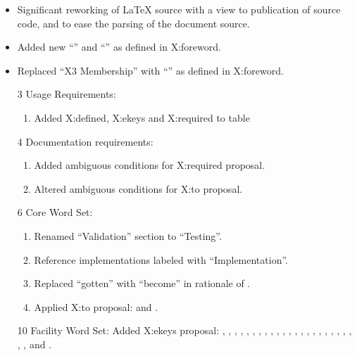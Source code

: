 	\begin{itemize}
	\item Significant reworking of \LaTeX{} source with a view to
		publication of source code, and to ease the parsing of the
		document source.

	\item Added new ``'' and ``'' as defined
		in \textsf{X:foreword}.

	\item Replaced ``X3 Membership'' with ``'' as
		defined in \textsf{X:foreword}.

	\item[3] Usage Requirements:
		\begin{enumerate}
		\item Added
			\textsf{X:defined},
			\textsf{X:ekeys} and
			\textsf{X:required}
			to table 
		\end{enumerate}

	\item[4] Documentation requirements:
		\begin{enumerate}
		\item Added ambiguous conditions for \textsf{X:required} proposal.
		\item Altered ambiguous conditions for \textsf{X:to} proposal.
		\end{enumerate}

	\item[6] Core Word Set:
		\begin{enumerate}
		\item Renamed ``Validation'' section to ``Testing''.
		\item Reference implementations labeled with ``Implementation''.
		\item Replaced ``gotten'' with ``become'' in rationale of
			.
		\item Applied \textsf{X:to} proposal:
			 and .
		\end{enumerate}

	\item[10] Facility Word Set:
		Added \textsf{X:ekeys} proposal:
		,
		,
		,
		,
		,
		,
		,
		,
		,
		,
		,
		,
		,
		,
		,
		,
		,
		,
		,
		,
		,
		,
		,
		,
		 and
		.


\end{itemize}
